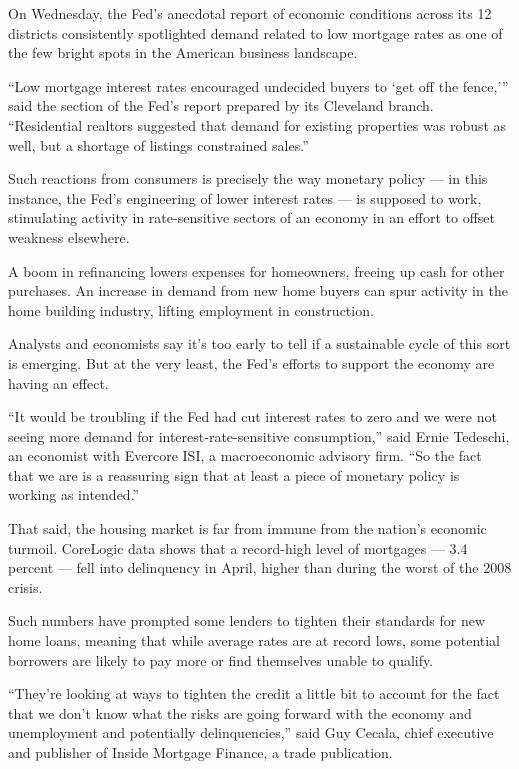 On Wednesday, the Fed's anecdotal report of economic conditions across
its 12 districts consistently spotlighted demand related to low mortgage
rates as one of the few bright spots in the American business landscape.

``Low mortgage interest rates encouraged undecided buyers to `get off
the fence,''' said the section of the Fed's report prepared by its
Cleveland branch. ``Residential realtors suggested that demand for
existing properties was robust as well, but a shortage of listings
constrained sales.''

Such reactions from consumers is precisely the way monetary policy ---
in this instance, the Fed's engineering of lower interest rates --- is
supposed to work, stimulating activity in rate-sensitive sectors of an
economy in an effort to offset weakness elsewhere.

A boom in refinancing lowers expenses for homeowners, freeing up cash
for other purchases. An increase in demand from new home buyers can spur
activity in the home building industry, lifting employment in
construction.

Analysts and economists say it's too early to tell if a sustainable
cycle of this sort is emerging. But at the very least, the Fed's efforts
to support the economy are having an effect.

``It would be troubling if the Fed had cut interest rates to zero and we
were not seeing more demand for interest-rate-sensitive consumption,''
said Ernie Tedeschi, an economist with Evercore ISI, a macroeconomic
advisory firm. ``So the fact that we are is a reassuring sign that at
least a piece of monetary policy is working as intended.''

That said, the housing market is far from immune from the nation's
economic turmoil. CoreLogic data shows that a record-high level of
mortgages --- 3.4 percent --- fell into delinquency in April, higher
than during the worst of the 2008 crisis.

Such numbers have prompted some lenders to tighten their standards for
new home loans, meaning that while average rates are at record lows,
some potential borrowers are likely to pay more or find themselves
unable to qualify.

``They're looking at ways to tighten the credit a little bit to account
for the fact that we don't know what the risks are going forward with
the economy and unemployment and potentially delinquencies,'' said Guy
Cecala, chief executive and publisher of Inside Mortgage Finance, a
trade publication.

